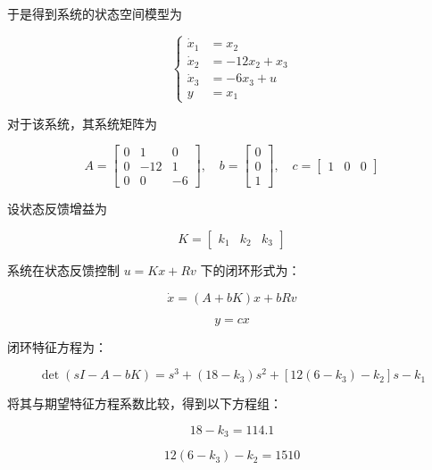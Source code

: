 \begin{example}
\begin{enumerate}
            于是得到系统的状态空间模型为

            \[
            \left\{
            \begin{aligned}
            \dot{x}_1 &= x_2\\
            \dot{x}_2 &= -12x_2+x_3\\
            \dot{x}_3 &= -6x_3+u\\
            y &= x_1
            \end{aligned}
            \right.
            \]

            对于该系统，其系统矩阵为

            \[
            A=
            \begin{bmatrix}
            0 & 1 & 0\\
            0 & -12 & 1\\
            0 & 0 & -6
            \end{bmatrix},
            \quad
            b=
            \begin{bmatrix}
            0\\
            0\\
            1
            \end{bmatrix},
            \quad
            c=
            \begin{bmatrix}
            1 & 0 & 0
            \end{bmatrix}
            \]

            设状态反馈增益为

            \[
            K=
            \begin{bmatrix}
            k_1 & k_2 & k_3
            \end{bmatrix}
            \]

            系统在状态反馈控制 $u=Kx+Rv$ 下的闭环形式为：

            \[
            \dot{x}=(A+bK)x+bRv
            \]

            \[
            y=cx
            \]

            闭环特征方程为：

            \[
            \det(sI-A-bK)
            =s^3+(18-k_3)s^2+\left[12(6-k_3)-k_2\right]s-k_1
            \]

            将其与期望特征方程系数比较，得到以下方程组：

            \[
            18-k_3=114.1
            \]

            \[
            12(6-k_3)-k_2=1510
            \]


\end{enumerate}
\end{example}
